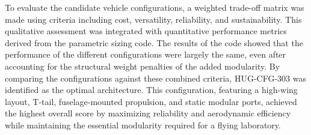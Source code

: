 To evaluate the candidate vehicle configurations, a weighted trade-off matrix was made using criteria including cost, versatility, reliability, and sustainability. This qualitative assessment was integrated with quantitative performance metrics derived from the parametric sizing code. The results of the code showed that the performance of the different configurations were largely the same, even after accounting for the structural weight penalties of the added modularity. By comparing the configurations against these combined criteria, HUG-CFG-303 was identified as the optimal architecture. This configuration, featuring a high-wing layout, T-tail, fuselage-mounted propulsion, and static modular ports, achieved the highest overall score by maximizing reliability and aerodynamic efficiency while maintaining the essential modularity required for a flying laboratory.

